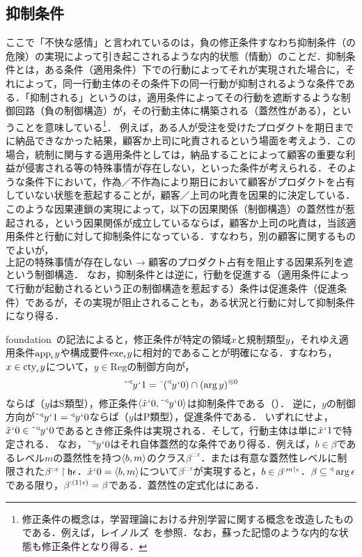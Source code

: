 \subsection{抑制条件}
\label{ssec:抑制条件}

ここで「不快な感情」と言われているのは，負の修正条件すなわち抑制条件（の危険）の実現によって引き起こされるような内的状態（情動）のことだ．抑制条件とは，ある条件（適用条件）下での行動によってそれが実現された場合に，それによって，同一行動主体のその条件下の同一行動が抑制されるような条件である．「抑制される」というのは，適用条件によってその行動を遮断するような制御回路（負の制御構造）が，その行動主体に構築される（蓋然性がある），ということを意味している\footnote{修正条件の概念は，学習理論における弁別学習に関する概念を改造したものである．例えば，レイノルズ~\cite[pp.\,8--12]{レイノルズ}を参照．なお，蘇った記憶のような内的な状態も修正条件となり得る．}．
例えば，ある人が受注を受けたプロダクトを期日までに納品できなかった結果，顧客か上司に叱責されるという場面を考えよう．この場合，統制に関与する適用条件としては，納品することによって顧客の重要な利益が侵害される等の特殊事情が存在しない，といった条件が考えられる．そのような条件下において，作為／不作為により期日において顧客がプロダクトを占有していない状態を惹起することが，顧客／上司の叱責を因果的に決定している．
このような因果連鎖の実現によって，以下の因果関係（制御構造）の蓋然性が惹起される，という因果関係が成立しているならば，顧客か上司の叱責は，当該適用条件と行動に対して抑制条件になっている．すなわち，別の顧客に関するものでよいが，
\[
   \text{上記の特殊事情が存在しない → 顧客のプロダクト占有を阻止する因果系列を遮断}
\]
という制御構造．
なお，抑制条件とは逆に，行動を促進する（適用条件によって行動が起動されるという正の制御構造を惹起する）条件は促進条件（促進条件）であるが，その実現が阻止されることも，ある状況と行動に対して抑制条件になり得る．

foundation~\cite{foundation}の記法によると，修正条件が特定の領域$x$と規制類型$y$，それゆえ適用条件$\mathrm{app}_{\epsilon}y$や構成要件$\mathrm{exe}_{\epsilon}y$に相対的であることが明確になる．すなわち，$ x\in\mathrm{cty}_{\epsilon}y $について，$y\in\mathrm{Reg}$の制御方向が，
\[
    \tilde{\:\:}{^\triangleleft}y{\mspace{1mu}{`}\mspace{1mu}} 1 = \bar{\:\:}({^\triangleleft}y{\mspace{1mu}{`}\mspace{1mu}} 0)\cap(\arg y)^{\circledcirc 0}
\]
ならば（$y$はS類型），修正条件$ \langle \tilde{x}{\mspace{1mu}{`}\mspace{1mu}} 0,\tilde{\:\:}{^\triangleleft}y{\mspace{1mu}{`}\mspace{1mu}} 0 \rangle $は抑制条件である（）．
逆に，$ y $の制御方向が$\tilde{\:\:}{^\triangleleft}y{\mspace{1mu}{`}\mspace{1mu}} 1 = {^\triangleleft}y{\mspace{1mu}{`}\mspace{1mu}} 0 $ならば（$y$はP類型），促進条件である．
いずれにせよ，$ \tilde{x}{\mspace{1mu}{`}\mspace{1mu}} 0\in\tilde{\:\:}{^\triangleleft}y{\mspace{1mu}{`}\mspace{1mu}} 0 $であるとき修正条件は実現される．そして，行動主体は単に$\tilde{x}{\mspace{1mu}{`}\mspace{1mu}} 1$で特定される．
なお，$\tilde{\:\:}{^\triangleleft}y{\mspace{1mu}{`}\mspace{1mu}} 0$はそれ自体蓋然的な条件であり得る．例えば，$b\in\beta$であるレベル$m$の蓋然性を持つ$\langle b,m \rangle$のクラス$\beta^{::\epsilon}$．または有意な蓋然性レベルに制限された$\beta^{::\epsilon}\mathbin{\upharpoonright}\mathfrak{h}\epsilon$．$\tilde{x}{\mspace{1mu}{`}\mspace{1mu}} 0 = \langle b,m \rangle$について$\beta^{::\epsilon}$が実現すると，$b\in \beta^{:m\mathbin{\upharpoonleft}\epsilon}$．$ \beta\subseteq{^\triangleleft}\arg\epsilon $である限り，$ \beta^{:(1\mathbin{\upharpoonleft}\epsilon)}=\beta $である．蓋然性の定式化はにある．

